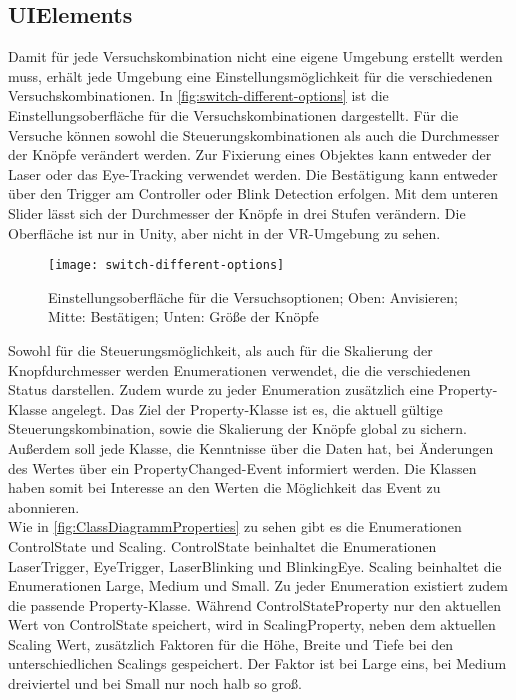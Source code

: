 \subsection{UIElements}
Damit für jede Versuchskombination nicht eine eigene Umgebung erstellt werden muss, erhält jede Umgebung eine Einstellungsmöglichkeit für die verschiedenen Versuchskombinationen. In \autoref{fig:switch-different-options} ist die Einstellungsoberfläche für die Versuchskombinationen dargestellt. Für die Versuche können sowohl die Steuerungskombinationen als auch die Durchmesser der Knöpfe verändert werden. Zur Fixierung eines Objektes kann entweder der Laser oder das Eye-Tracking verwendet werden. Die Bestätigung kann entweder über den Trigger am Controller oder Blink Detection erfolgen. Mit dem unteren Slider lässt sich der Durchmesser der Knöpfe in drei Stufen verändern. Die Oberfläche ist nur in Unity, aber nicht in der \ac{VR}-Umgebung zu sehen.

\begin{figure}[!htbp]
	\centering
	\texttt{[image: switch-different-options]}
	\caption[Einstellungsoberfläche für die Versuchsoptionen]{Einstellungsoberfläche für die Versuchsoptionen; Oben: Anvisieren; Mitte: Bestätigen; Unten: Größe der Knöpfe}
	\label{fig:switch-different-options}
\end{figure}

Sowohl für die Steuerungsmöglichkeit, als auch für die Skalierung der Knopfdurchmesser werden Enumerationen verwendet, die die verschiedenen Status darstellen. Zudem wurde zu jeder Enumeration zusätzlich eine Property-Klasse angelegt. Das Ziel der Property-Klasse ist es, die aktuell gültige Steuerungskombination, sowie die Skalierung der Knöpfe global zu sichern. Außerdem soll jede Klasse, die Kenntnisse über die Daten hat, bei Änderungen des Wertes über ein PropertyChanged-Event informiert werden. Die Klassen haben somit bei Interesse an den Werten die Möglichkeit das Event zu abonnieren. \\
Wie in \autoref{fig:ClassDiagrammProperties} zu sehen gibt es die Enumerationen {\ttfamily ControlState} und {\ttfamily Scaling}. ControlState beinhaltet die Enumerationen LaserTrigger, EyeTrigger, LaserBlinking und BlinkingEye. Scaling beinhaltet die Enumerationen Large, Medium und Small. Zu jeder Enumeration existiert zudem die passende Property-Klasse. Während {\ttfamily ControlStateProperty} nur den aktuellen Wert von ControlState speichert, wird in {\ttfamily ScalingProperty}, neben dem aktuellen Scaling Wert, zusätzlich Faktoren für die Höhe, Breite und Tiefe bei den unterschiedlichen Scalings gespeichert. Der Faktor ist bei Large eins, bei Medium dreiviertel und bei Small nur noch halb so groß.


